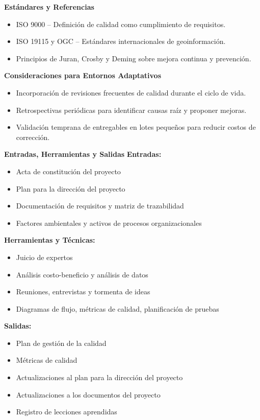 \begin{multicols}{2}
\textbf{Estándares y Referencias}
\begin{itemize}
    \item ISO 9000 – Definición de calidad como cumplimiento de requisitos.
    \item ISO 19115 y OGC – Estándares internacionales de geoinformación.
    \item Principios de Juran, Crosby y Deming sobre mejora continua y prevención.
\end{itemize}

\textbf{Consideraciones para Entornos Adaptativos}
\begin{itemize}
    \item Incorporación de revisiones frecuentes de calidad durante el ciclo de vida.
    \item Retrospectivas periódicas para identificar causas raíz y proponer mejoras.
    \item Validación temprana de entregables en lotes pequeños para reducir costos de corrección.
\end{itemize}

\textbf{Entradas, Herramientas y Salidas}
\textbf{Entradas:}
\begin{itemize}
    \item Acta de constitución del proyecto
    \item Plan para la dirección del proyecto
    \item Documentación de requisitos y matriz de trazabilidad
    \item Factores ambientales y activos de procesos organizacionales
\end{itemize}

\textbf{Herramientas y Técnicas:}
\begin{itemize}
    \item Juicio de expertos
    \item Análisis costo-beneficio y análisis de datos
    \item Reuniones, entrevistas y tormenta de ideas
    \item Diagramas de flujo, métricas de calidad, planificación de pruebas
\end{itemize}

\textbf{Salidas:}
\begin{itemize}
    \item Plan de gestión de la calidad
    \item Métricas de calidad
    \item Actualizaciones al plan para la dirección del proyecto
    \item Actualizaciones a los documentos del proyecto
    \item Registro de lecciones aprendidas
\end{itemize}


\end{multicols}
